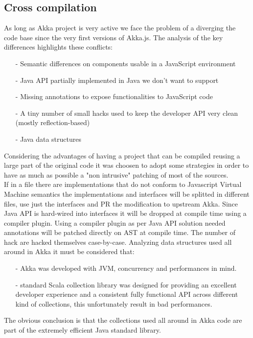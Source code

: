 \documentclass{sig-alternate}
\begin{document}
\subsection{Cross compilation}\label{sec:cross-compilation}

As long as Akka project is very active we face the problem of a diverging the code base since the very first versions of Akka.js.
The analysis of the key differences highlights these conflicts:
\begin{itemize}
	\item[-] Semantic differences on components usable in a JavaScript environment
	\item[-] Java API partially implemented in Java we don't want to support
	\item[-] Missing annotations to expose functionalities to JavaScript code
	\item[-] A tiny number of small hacks used to keep the developer API very clean (mostly reflection-based)
	\item[-] Java data structures
\end{itemize}
Considering the advantages of having a project that can be compiled reusing a large part of the original code it was choosen to adopt some strategies in order to have as much as possible a "non intrusive" patching of most of the sources.
\\
If in a file there are implementations that do not conform to Javascript Virtual Machine semantics the implementations and interfaces will be splitted in different files, use just the interfaces and PR the modification to upstream Akka.
Since Java API is hard-wired into interfaces it will be dropped at compile time using a compiler plugin.
Using a compiler plugin as per Java API solution needed annotations will be patched directly on AST at compile time.
The number of hack are hacked themselves case-by-case.
Analyzing data structures used all around in Akka it must be considered that:
\begin{itemize}
	\item[-] Akka was developed with JVM, concurrency and performances in mind.
	\item[-] standard Scala collection library was designed for providing an excellent developer experience and a consistent fully functional API across different kind of collections, this unfortunately result in bad performances.
\end{itemize}
The obvious conclusion is that the collections used all around in Akka code are part of the extremely efficient Java standard library.
\end{document}

